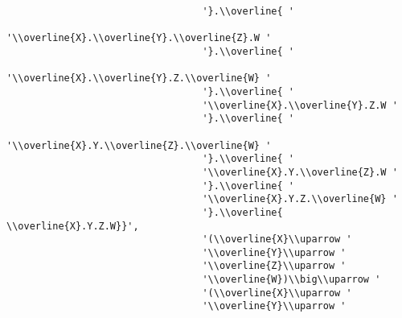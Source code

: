 \begin{verbatim}
                                  '}.\\overline{ '
                                  '\\overline{X}.\\overline{Y}.\\overline{Z}.W '
                                  '}.\\overline{ '
                                  '\\overline{X}.\\overline{Y}.Z.\\overline{W} '
                                  '}.\\overline{ '
                                  '\\overline{X}.\\overline{Y}.Z.W '
                                  '}.\\overline{ '
                                  '\\overline{X}.Y.\\overline{Z}.\\overline{W} '
                                  '}.\\overline{ '
                                  '\\overline{X}.Y.\\overline{Z}.W '
                                  '}.\\overline{ '
                                  '\\overline{X}.Y.Z.\\overline{W} '
                                  '}.\\overline{ \\overline{X}.Y.Z.W}}',
                                  '(\\overline{X}\\uparrow '
                                  '\\overline{Y}\\uparrow '
                                  '\\overline{Z}\\uparrow '
                                  '\\overline{W})\\big\\uparrow '
                                  '(\\overline{X}\\uparrow '
                                  '\\overline{Y}\\uparrow '

\end{verbatim}
